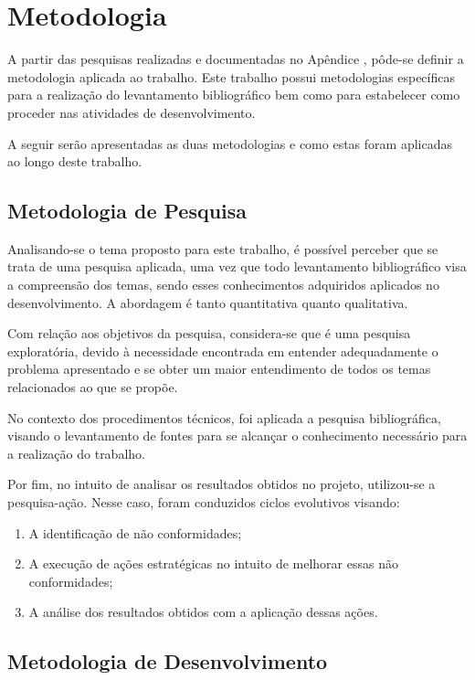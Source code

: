 \chapter{Metodologia}
\label{chapter:Metodologia}

A partir das pesquisas realizadas e documentadas no Apêndice , pôde-se definir a metodologia aplicada ao trabalho. Este trabalho possui metodologias específicas para a realização do levantamento bibliográfico bem como para estabelecer como proceder nas atividades de desenvolvimento.

A seguir serão apresentadas as duas metodologias e como estas foram aplicadas ao longo deste trabalho.

\section{Metodologia de Pesquisa}

Analisando-se o tema proposto para este trabalho, é possível perceber que se trata de uma pesquisa aplicada, uma vez que todo levantamento bibliográfico visa a compreensão dos temas, sendo esses conhecimentos adquiridos aplicados no desenvolvimento. A abordagem é tanto quantitativa quanto qualitativa.

Com relação aos objetivos da pesquisa, considera-se que é uma pesquisa exploratória, devido à necessidade encontrada em entender adequadamente o problema apresentado e se obter um maior entendimento de todos os temas relacionados ao que se propõe.

No contexto dos procedimentos técnicos, foi aplicada a pesquisa bibliográfica, visando o levantamento de fontes para se alcançar o conhecimento necessário para a realização do trabalho.

Por fim, no intuito de analisar os resultados obtidos no projeto, utilizou-se a pesquisa-ação. Nesse caso, foram conduzidos ciclos evolutivos visando:

\begin{enumerate}
	\item A identificação de não conformidades;
	\item A execução de ações estratégicas no intuito de melhorar essas não conformidades;
	\item A análise dos resultados obtidos com a aplicação dessas ações.
\end{enumerate}

\section{Metodologia de Desenvolvimento}


